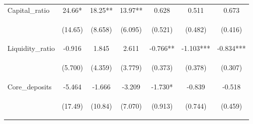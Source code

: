 \documentclass[]{article}
\begin{document}
\begin{center}
\begin{tabular}{lcccccc}
Capital\_ratio & 24.66* & 18.25** & 13.97** & 0.628 & 0.511 & 0.673 \\
\vspace{4pt} & \begin{footnotesize}(14.65)\end{footnotesize} & \begin{footnotesize}(8.658)\end{footnotesize} & \begin{footnotesize}(6.095)\end{footnotesize} & \begin{footnotesize}(0.521)\end{footnotesize} & \begin{footnotesize}(0.482)\end{footnotesize} & \begin{footnotesize}(0.416)\end{footnotesize} \\
Liquidity\_ratio & -0.916 & 1.845 & 2.611 & -0.766** & -1.103*** & -0.834*** \\
\vspace{4pt} & \begin{footnotesize}(5.700)\end{footnotesize} & \begin{footnotesize}(4.359)\end{footnotesize} & \begin{footnotesize}(3.779)\end{footnotesize} & \begin{footnotesize}(0.373)\end{footnotesize} & \begin{footnotesize}(0.378)\end{footnotesize} & \begin{footnotesize}(0.307)\end{footnotesize} \\
Core\_deposits & -5.464 & -1.666 & -3.209 & -1.730* & -0.839 & -0.518 \\
\vspace{4pt} & \begin{footnotesize}(17.49)\end{footnotesize} & \begin{footnotesize}(10.84)\end{footnotesize} & \begin{footnotesize}(7.070)\end{footnotesize} & \begin{footnotesize}(0.913)\end{footnotesize} & \begin{footnotesize}(0.744)\end{footnotesize} & \begin{footnotesize}(0.459)\end{footnotesize} \\

\end{tabular}
\end{center}
\end{document}
